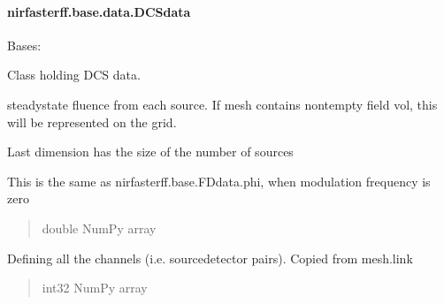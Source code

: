 \documentclass[letterpaper,10pt,english]{sphinxmanual}
\begin{document}
\sphinxstepscope


\paragraph{nirfasterff.base.data.DCSdata}
\label{\detokenize{_autosummary/nirfasterff.base.data.DCSdata:nirfasterff-base-data-dcsdata}}\label{\detokenize{_autosummary/nirfasterff.base.data.DCSdata::doc}}

\begin{fulllineitems}
\label{\detokenize{_autosummary/nirfasterff.base.data.DCSdata:nirfasterff.base.data.DCSdata}}
\pysigstartsignatures
\pysigline
{}
\pysigstopsignatures
\sphinxAtStartPar
Bases: 

\sphinxAtStartPar
Class holding DCS data.

\begin{fulllineitems}
\label{\detokenize{_autosummary/nirfasterff.base.data.DCSdata:nirfasterff.base.data.DCSdata.phi}}
\pysigstartsignatures
\pysigline
{}
\pysigstopsignatures
\sphinxAtStartPar
steady\sphinxhyphen{}state fluence from each source. If mesh contains non\sphinxhyphen{}tempty field vol, this will be represented on the grid.

\sphinxAtStartPar
Last dimension has the size of the number of sources

\sphinxAtStartPar
This is the same as nirfasterff.base.FDdata.phi, when modulation frequency is zero
\begin{quote}\begin{description}
\sphinxAtStartPar
double NumPy array

\end{description}\end{quote}

\end{fulllineitems}


\begin{fulllineitems}
\label{\detokenize{_autosummary/nirfasterff.base.data.DCSdata:nirfasterff.base.data.DCSdata.link}}
\pysigstartsignatures
\pysigline
{}
\pysigstopsignatures
\sphinxAtStartPar
Defining all the channels (i.e. source\sphinxhyphen{}detector pairs). Copied from mesh.link
\begin{quote}\begin{description}
\sphinxAtStartPar
int32 NumPy array


\end{description}
\end{quote}
\end{fulllineitems}
\end{fulllineitems}
\end{document}
